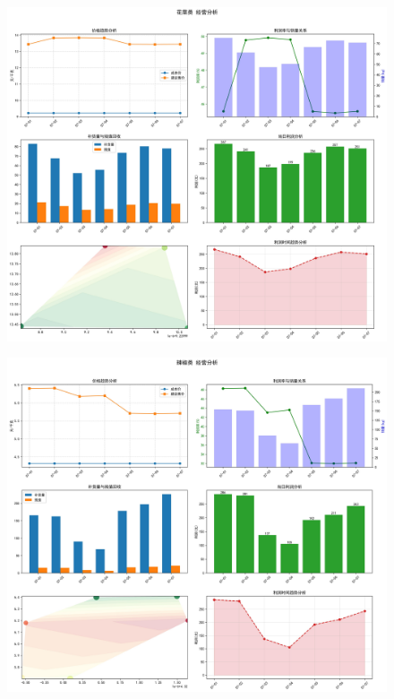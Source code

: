\documentclass{cumcmthesis} %
\begin{document}
\begin{figure}[H]
    \centering
    \begin{minipage}[c]{0.49\textwidth}
        \centering
        \includegraphics[width=\textwidth]{fig/花菜类_可视化.jpg}
        \label{fig:sample-figure-a}
    \end{minipage}
    \hfill
    \begin{minipage}[c]{0.49\textwidth}
        \centering
        \includegraphics[width=\textwidth]{fig/辣椒类_可视化.jpg}
        \label{fig:sample-figure-b}
    \end{minipage}
\end{figure}
\end{document}
